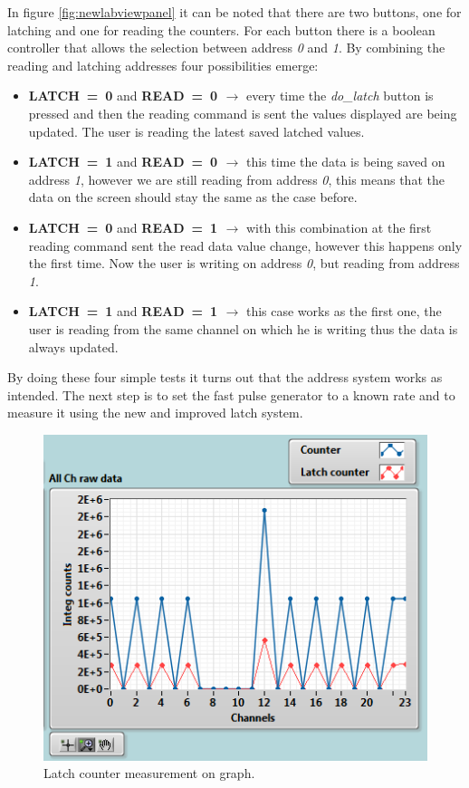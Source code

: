 In figure \ref{fig:newlabviewpanel} it can be noted that there are two buttons, one for latching and one for reading the counters. For each button there is a boolean controller that allows the selection between address \textit{0} and \textit{1}.
By combining the reading and latching addresses four possibilities emerge:
\begin{itemize}
	\item \textbf{LATCH~=~0} and \textbf{READ~=~0 $\rightarrow$} every time the \textit{do\_latch} button is pressed and then the reading command is sent the values displayed are being updated. The user is reading the latest saved latched values.
	\item \textbf{LATCH~=~1} and \textbf{READ~=~0 $\rightarrow$} this time the data is being saved on address \textit{1}, however we are still reading from address \textit{0}, this means that the data on the screen should stay the same as the case before.
	\item \textbf{LATCH~=~0} and \textbf{READ~=~1 $\rightarrow$} with this combination at the first reading command sent the read data value change, however this happens only the first time. Now the user is writing on address \textit{0}, but reading from address \textit{1}. 
	\item \textbf{LATCH~=~1} and \textbf{READ~=~1 $\rightarrow$} this case works as the first one, the user is reading from the same channel on which he is writing thus the data is always updated. 
\end{itemize}
\noindent By doing these four simple tests it turns out that the address system works as intended. The next step is to set the fast pulse generator to a known rate and to measure it using the new and improved latch system.
\begin{figure}[H]
	\centering
	\includegraphics[width=0.5\linewidth]{IMG/ch5/latch_tests/fig2.PNG}
	\caption{Latch counter measurement on graph.}
	\label{fig:latchfigure}
\end{figure}
